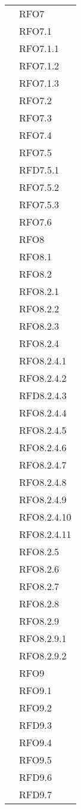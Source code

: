 \begin{longtable}{ p{12cm} | p{4cm} }
			& RFO7 \\
			& RFO7.1 \\
			& RFO7.1.1 \\
			& RFO7.1.2 \\
			& RFO7.1.3 \\
			& RFO7.2 \\
			& RFO7.3 \\
			& RFO7.4 \\
			& RFO7.5 \\
			& RFD7.5.1 \\
			& RFO7.5.2 \\
			& RFO7.5.3 \\
			& RFO7.6 \\
			& RFO8 \\
			& RFO8.1 \\
			& RFO8.2 \\
			& RFO8.2.1 \\
			& RFO8.2.2 \\
			& RFO8.2.3 \\
			& RFO8.2.4 \\
			& RFO8.2.4.1 \\
			& RFO8.2.4.2 \\
			& RFD8.2.4.3 \\
			& RFO8.2.4.4 \\
			& RFO8.2.4.5 \\
			& RFO8.2.4.6 \\
			& RFO8.2.4.7 \\
			& RFO8.2.4.8 \\
			& RFO8.2.4.9 \\
			& RFO8.2.4.10 \\
			& RFO8.2.4.11 \\
			& RFO8.2.5 \\
			& RFO8.2.6 \\
			& RFO8.2.7 \\
			& RFO8.2.8 \\
			& RFO8.2.9 \\
			& RFO8.2.9.1 \\
			& RFO8.2.9.2 \\
			& RFO9 \\
			& RFO9.1 \\
			& RFO9.2 \\
			& RFD9.3 \\
			& RFO9.4 \\
			& RFO9.5 \\
			& RFD9.6 \\
			& RFD9.7 \\

\end{longtable}
